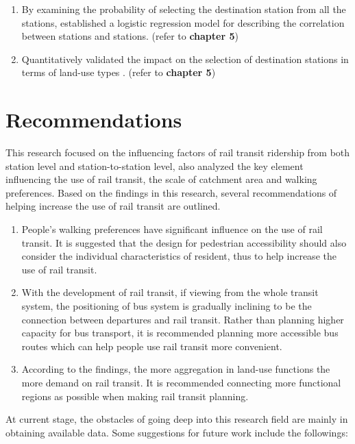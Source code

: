 \begin{enumerate}
	\item By examining the probability of selecting the destination station from all the stations, established a logistic regression model for describing the correlation between stations and stations. (refer to \textbf{chapter 5})
	
	\item Quantitatively validated the impact on the selection of destination stations in terms of land-use types . (refer to \textbf{chapter 5})
	
\end{enumerate} 

\section{Recommendations}
This research focused on the influencing factors of rail transit ridership from both station level and station-to-station level, also analyzed the key element influencing the use of rail transit, the scale of catchment area and walking preferences. Based on the findings in this research, several recommendations of helping increase the use of rail transit are outlined.

%
\begin{enumerate}
	\item People's walking preferences have significant influence on the use of rail transit. It is suggested that the design for pedestrian accessibility should also consider the individual characteristics of resident, thus to help increase the use of rail transit.
	
	\item With the development of rail transit, if viewing from the whole transit system, the positioning of bus system is gradually inclining to be the connection between departures and rail transit. Rather than planning higher capacity for bus transport, it is recommended planning more accessible bus routes which can help people use rail transit more convenient.
	
	\item According to the findings, the more aggregation in land-use functions the more demand on rail transit. It is recommended connecting more functional regions as possible when making rail transit planning.
\end{enumerate}

At current stage, the obstacles of going deep into this research field are mainly in obtaining available data. Some suggestions for future work include the followings:

